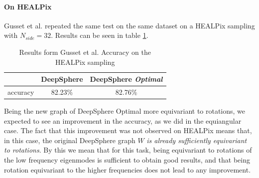 \paragraph{On HEALPix }
Gusset et al. repeated the same test on the same dataset on a HEALPix sampling with $N_{side}=32$. Results can be seen in table \ref{table:results}.
\begin{table}[h!]
	\centering
	\begin{tabular}{ c|c|c } 
		& DeepSphere & DeepSphere \textit{Optimal} \\ 
		\hline
		accuracy & 82.23\% & 82.76\% \\ 
	\end{tabular}
	\caption{\label{table:results}Results form Gusset et al. Accuracy on the HEALPix sampling}
\end{table}
Being the new graph of DeepSphere Optimal more equivariant to rotations, we expected to see an improvement in the accuracy, as we did in the equiangular case. The fact that this improvement was not observed on HEALPix means that, in this case, the original DeepSphere graph $W$ \textit{is already sufficiently equivariant to rotations}. By this we mean that for this task, being equivariant to rotations of the low frequency eigenmodes is sufficient to obtain good results, and that being rotation equivariant to the higher frequencies does not lead to any improvement.

